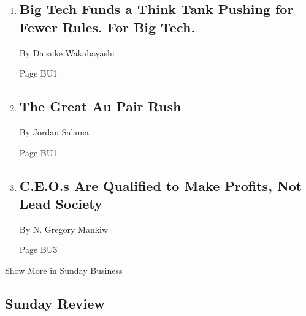 \begin{enumerate}
\def\labelenumi{\arabic{enumi}.}
\item
  \href{/2020/07/24/technology/global-antitrust-institute-google-amazon-qualcomm.html}{}

  \hypertarget{big-tech-funds-a-think-tank-pushing-for-fewer-rules-for-big-tech-1}{%
  \subsection{Big Tech Funds a Think Tank Pushing for Fewer Rules. For
  Big
  Tech.}\label{big-tech-funds-a-think-tank-pushing-for-fewer-rules-for-big-tech-1}}

  By Daisuke Wakabayashi

  Page BU1
\item
  \href{/2020/07/25/business/the-great-au-pair-rush.html}{}

  \hypertarget{the-great-au-pair-rush}{%
  \subsection{The Great Au Pair Rush}\label{the-great-au-pair-rush}}

  By Jordan Salama

  Page BU1
\item
  \href{/2020/07/24/business/ceos-profits-shareholders.html}{}

  \hypertarget{ceos-are-qualified-to-make-profits-not-lead-society}{%
  \subsection{C.E.O.s Are Qualified to Make Profits, Not Lead
  Society}\label{ceos-are-qualified-to-make-profits-not-lead-society}}

  By N. Gregory Mankiw

  Page BU3
\end{enumerate}

Show More in Sunday Business

\hypertarget{sunday-review}{%
\subsection{Sunday Review}\label{sunday-review}}

